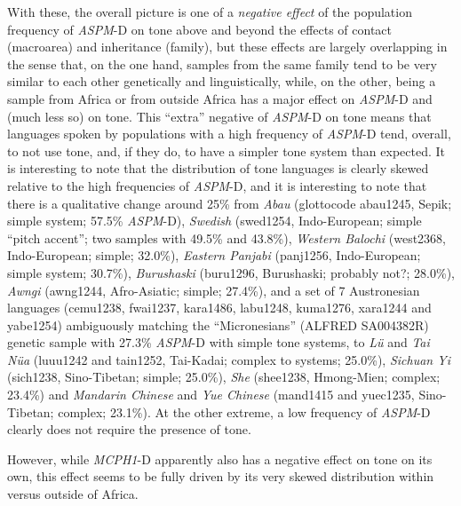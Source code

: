 \documentclass[twoside,onecolumn]{article}
\begin{document}
With these, the overall picture is one of a \emph{negative effect} of the population frequency of \textit{ASPM}-D on tone above and beyond the effects of contact (macroarea) and inheritance (family), but these effects are largely overlapping in the sense that, on the one hand, samples from the same family tend to be very similar to each other genetically and linguistically, while, on the other, being a sample from Africa or from outside Africa has a major effect on \textit{ASPM}-D and (much less so) on tone.
This ``extra'' negative of \textit{ASPM}-D on tone means that languages spoken by populations with a high frequency of \textit{ASPM}-D tend, overall, to not use tone, and, if they do, to have a simpler tone system than expected.
It is interesting to note that the distribution of tone languages is clearly skewed relative to the high frequencies of \textit{ASPM}-D, and it is interesting to note that there is a qualitative change around 25\% from \textit{Abau} (glottocode abau1245, Sepik; simple system; 57.5\% \textit{ASPM}-D), \textit{Swedish} (swed1254, Indo-European; simple ``pitch accent''; two samples with 49.5\% and 43.8\%), \textit{Western Balochi} (west2368, Indo-European; simple; 32.0\%), \textit{Eastern Panjabi} (panj1256, Indo-European; simple system; 30.7\%), \textit{Burushaski} (buru1296, Burushaski; probably not?; 28.0\%), \textit{Awngi} (awng1244, Afro-Asiatic; simple; 27.4\%), and a set of 7 Austronesian languages (cemu1238, fwai1237, kara1486, labu1248, kuma1276, xara1244 and yabe1254) ambiguously matching the ``Micronesians'' (ALFRED SA004382R) genetic sample with 27.3\% \textit{ASPM}-D with simple tone systems, to \textit{L\"{u}} and \textit{Tai N\"{u}a} (luuu1242 and tain1252, Tai-Kadai; complex to systems; 25.0\%), \textit{Sichuan Yi} (sich1238, Sino-Tibetan; simple; 25.0\%), \textit{She} (shee1238, Hmong-Mien; complex; 23.4\%) and \textit{Mandarin Chinese} and \textit{Yue Chinese} (mand1415 and yuec1235, Sino-Tibetan; complex; 23.1\%).
At the other extreme, a low frequency of \textit{ASPM}-D clearly does not require the presence of tone.

However, while \textit{MCPH1}-D apparently also has a negative effect on tone on its own, this effect seems to be fully driven by its very skewed distribution within versus outside of Africa.
\end{document}

